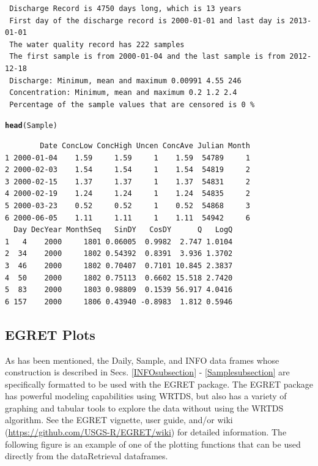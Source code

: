 \documentclass[a4paper,11pt]{article}\usepackage[]{graphicx}\usepackage[]{color}
\makeatletter
\newcommand{\hlstd}[1]{\textcolor[rgb]{0.345,0.345,0.345}{#1}}%
\newcommand{\hlkwd}[1]{\textcolor[rgb]{0.737,0.353,0.396}{\textbf{#1}}}%
\newenvironment{kframe}{%
 \def\at@end@of@kframe{}%
 \ifinner\ifhmode%
  \def\at@end@of@kframe{\end{minipage}}%
  \begin{minipage}{\columnwidth}%
 \fi\fi%
 \def\FrameCommand##1{\hskip\@totalleftmargin \hskip-\fboxsep
 \colorbox{shadecolor}{##1}\hskip-\fboxsep
     \hskip-\linewidth \hskip-\@totalleftmargin \hskip\columnwidth}%
 \MakeFramed {\advance\hsize-\width
   \@totalleftmargin\z@ \linewidth\hsize
   \@setminipage}}%
 {\par\unskip\endMakeFramed%
 \at@end@of@kframe}
\newenvironment{knitrout}{}{} %
\makeatother
\begin{document}
\begin{knitrout}
\begin{kframe}
\begin{verbatim}
 Discharge Record is 4750 days long, which is 13 years
 First day of the discharge record is 2000-01-01 and last day is 2013-01-01
 The water quality record has 222 samples
 The first sample is from 2000-01-04 and the last sample is from 2012-12-18
 Discharge: Minimum, mean and maximum 0.00991 4.55 246
 Concentration: Minimum, mean and maximum 0.2 1.2 2.4
 Percentage of the sample values that are censored is 0 %
\end{verbatim}
\begin{alltt}
\hlkwd{head}\hlstd{(Sample)}
\end{alltt}
\begin{verbatim}
        Date ConcLow ConcHigh Uncen ConcAve Julian Month
1 2000-01-04    1.59     1.59     1    1.59  54789     1
2 2000-02-03    1.54     1.54     1    1.54  54819     2
3 2000-02-15    1.37     1.37     1    1.37  54831     2
4 2000-02-19    1.24     1.24     1    1.24  54835     2
5 2000-03-23    0.52     0.52     1    0.52  54868     3
6 2000-06-05    1.11     1.11     1    1.11  54942     6
  Day DecYear MonthSeq   SinDY   CosDY      Q   LogQ
1   4    2000     1801 0.06005  0.9982  2.747 1.0104
2  34    2000     1802 0.54392  0.8391  3.936 1.3702
3  46    2000     1802 0.70407  0.7101 10.845 2.3837
4  50    2000     1802 0.75113  0.6602 15.518 2.7420
5  83    2000     1803 0.98809  0.1539 56.917 4.0416
6 157    2000     1806 0.43940 -0.8983  1.812 0.5946
\end{verbatim}
\end{kframe}
\end{knitrout}


\FloatBarrier

\subsection{EGRET Plots}
As has been mentioned, the Daily, Sample, and INFO data frames whose construction is described in Secs. \ref{INFOsubsection} - \ref{Samplesubsection} are specifically formatted to be used with the EGRET package. The EGRET package has powerful modeling capabilities using WRTDS, but also has a variety of graphing and tabular tools to explore the data without using the WRTDS algorithm. See the EGRET vignette, user guide, and/or wiki (\url{https://github.com/USGS-R/EGRET/wiki}) for detailed information. The following figure is an example of one of the plotting functions that can be used directly from the dataRetrieval dataframes.
\end{document}
